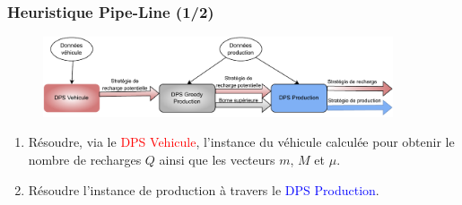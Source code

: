 \documentclass[hyperref={bookmarks=false},aspectratio=169]{beamer}
\begin{document}
\begin{frame}
	\frametitle{Heuristique Pipe-Line (1/2) }
\begin{figure}
    \centering
   \includegraphics[width=390]{./figures/slide_Pipeline.pdf}
    \label{fig:my_label}
\end{figure}
 
\begin {enumerate}
\item Résoudre, via le \textcolor{red}{DPS Vehicule}, l'instance du véhicule calculée pour obtenir le nombre de recharges $Q$ ainsi que les vecteurs $m$, $M$ et $\mu$. 
\item Résoudre l'instance de production à travers le \textcolor{blue}{DPS Production}. 
 \end {enumerate}

	    

	\end{frame}
\end{document}

